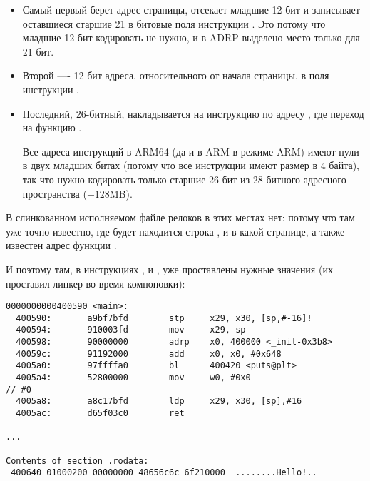 \begin{itemize}
\item 
Самый первый берет адрес страницы, отсекает младшие 12 бит и записывает оставшиеся старшие 21
в битовые поля инструкции . Это потому что младшие 12 бит кодировать не нужно,
и в ADRP выделено место только для 21 бит.

\item Второй ---- 12 бит адреса, относительного от начала страницы, в поля инструкции \ADD.

\item Последний, 26-битный, накладывается на инструкцию по адресу , где переход на функцию \printf.

Все адреса инструкций в ARM64 (да и в ARM в режиме ARM) имеют нули в двух младших битах
(потому что все инструкции имеют размер в 4 байта),
так что нужно кодировать только старшие 26 бит из 28-битного адресного пространства ($\pm 128$MB).

\end{itemize}

В слинкованном исполняемом файле релоков в этих местах нет: потому что там уже точно известно, 
где будет находится строка , и в какой странице, а также известен адрес функции \puts.

И поэтому там, в инструкциях , \ADD и , уже проставлены нужные значения 
(их проставил линкер во время компоновки):

\begin{lstlisting}[caption=objdump исполняемого файла]
0000000000400590 <main>:
  400590:       a9bf7bfd        stp     x29, x30, [sp,#-16]!
  400594:       910003fd        mov     x29, sp
  400598:       90000000        adrp    x0, 400000 <_init-0x3b8>
  40059c:       91192000        add     x0, x0, #0x648
  4005a0:       97ffffa0        bl      400420 <puts@plt>
  4005a4:       52800000        mov     w0, #0x0                        // #0
  4005a8:       a8c17bfd        ldp     x29, x30, [sp],#16
  4005ac:       d65f03c0        ret

...

Contents of section .rodata:
 400640 01000200 00000000 48656c6c 6f210000  ........Hello!..
\end{lstlisting}


